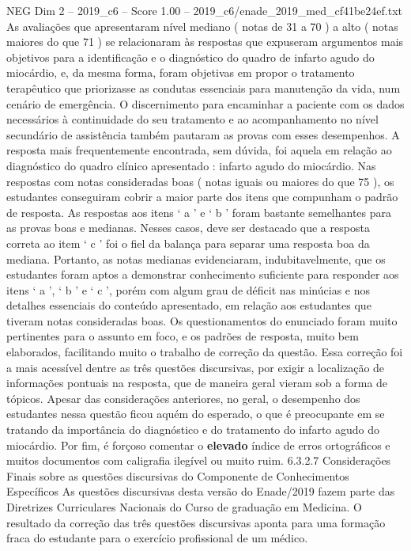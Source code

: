 \begin{textsample}{NEG Dim 2 – 2019\_c6 – Score 1.00 – 2019\_c6/enade\_2019\_med\_cf41be24ef.txt}
As avaliações que apresentaram nível mediano ( notas de 31 a 70 ) a alto ( notas maiores do que 71 ) se relacionaram às respostas que expuseram argumentos mais objetivos para a identificação e o diagnóstico do quadro de infarto agudo do miocárdio, e, da mesma forma, foram objetivas em propor o tratamento terapêutico que priorizasse as condutas essenciais para manutenção da vida, num cenário de emergência.
O discernimento para encaminhar a paciente com os dados necessários à continuidade do seu tratamento e ao acompanhamento no nível secundário de assistência também pautaram as provas com esses desempenhos.
A resposta mais frequentemente encontrada, sem dúvida, foi aquela em relação ao diagnóstico do quadro clínico apresentado : infarto agudo do miocárdio.
Nas respostas com notas consideradas boas ( notas iguais ou maiores do que 75 ), os estudantes conseguiram cobrir a maior parte dos itens que compunham o padrão de resposta.
As respostas aos itens ‘ a ’ e ‘ b ’ foram bastante semelhantes para as provas boas e medianas.
Nesses casos, deve ser destacado que a resposta correta ao item ‘ c ’ foi o fiel da balança para separar uma resposta boa da mediana.
Portanto, as notas medianas evidenciaram, indubitavelmente, que os estudantes foram aptos a demonstrar conhecimento suficiente para responder aos itens ‘ a ’, ‘ b ’ e ‘ c ’, porém com algum grau de déficit nas minúcias e nos detalhes essenciais do conteúdo apresentado, em relação aos estudantes que tiveram notas consideradas boas.
Os questionamentos do enunciado foram muito pertinentes para o assunto em foco, e os padrões de resposta, muito bem elaborados, facilitando muito o trabalho de correção da questão.
Essa correção foi a mais acessível dentre as três questões discursivas, por exigir a localização de informações pontuais na resposta, que de maneira geral vieram sob a forma de tópicos.
Apesar das considerações anteriores, no geral, o desempenho dos estudantes nessa questão ficou aquém do esperado, o que é preocupante em se tratando da importância do diagnóstico e do tratamento do infarto agudo do miocárdio.
Por fim, é forçoso comentar o \textbf{elevado} índice de erros ortográficos e muitos documentos com caligrafia ilegível ou muito ruim. 6.3.2.7 Considerações Finais sobre as questões discursivas do Componente de Conhecimentos Específicos As questões discursivas desta versão do Enade/2019 fazem parte das Diretrizes Curriculares Nacionais do Curso de graduação em Medicina.
O resultado da correção das três questões discursivas aponta para uma formação fraca do estudante para o exercício profissional de um médico.

\end{textsample}
